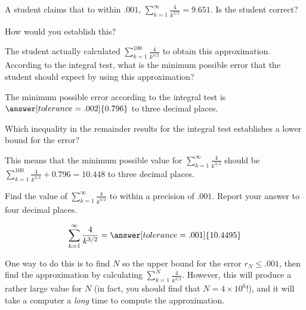 \documentclass{ximera}
\author{Jim Talamo}
\begin{document}
\begin{exercise}

A student claims that to within $.001$, $\sum_{k=1}^{\infty} \frac{4}{k^{3/2}} = 9.651$.  Is the student correct?

\begin{multipleChoice}
\end{multipleChoice}

How would you establish this?

\begin{multipleChoice}
\end{multipleChoice}

\begin{feedback}
The student actually calculated $\sum_{k=1}^{100} \frac{4}{k^{3/2}}$ to obtain this approximation.  According to the integral test, what is the minimum possible error that the student should expect by using this approximation?

The minimum possible error according to the integral test is $\answer[tolerance=.002]{0.796}$ to three decimal places.  
\end{feedback}

\begin{hint}
Which inequality in the remainder results for the integral test establishes a lower bound for the error?
\end{hint}

\begin{feedback}
This means that the minimum possible value for $\sum_{k=1}^{\infty} \frac{4}{k^{3/2}}$ should be $\sum_{k=1}^{100} \frac{4}{k^{3/2}} +0.796 = 10.448$ to three decimal places.
\end{feedback}

\begin{exercise}
Find the value of $\sum_{k=1}^{\infty} \frac{4}{k^{3/2}}$ to within a precision of $.001$.  Report your answer to four decimal places.

\[
\sum_{k=1}^{\infty} \frac{4}{k^{3/2}} = \answer[tolerance=.001]{10.4495}
\]

\begin{hint}
One way to do this is to find $N$ so the upper bound for the error $r_N \leq .001$, then find the approximation by calculating $\sum_{k=1}^{N} \frac{4}{k^{3/2}}$.  However, this will produce a rather large value for $N$ (in fact, you should find that $N=4 \times 10^6$!), and it will take a computer a \emph{long} time to compute the approximation.  


\end{hint}
\end{exercise}
\end{exercise}
\end{document}

